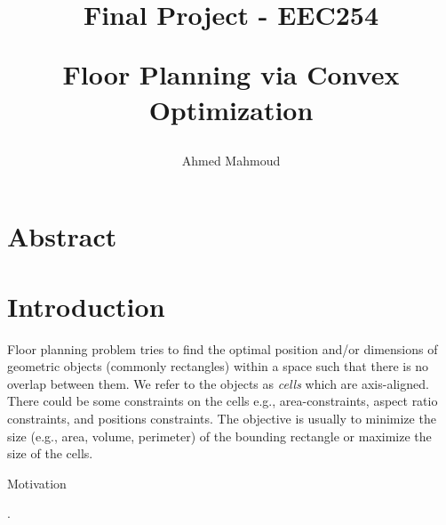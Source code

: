 \documentclass[12pt] {article}
\begin{document}

\title{
Final Project -  EEC254 \\
\begin{large}
Floor Planning via Convex Optimization
\end{large}
}
\author{Ahmed Mahmoud}
\date{}
\maketitle



\section{Abstract}
\section{Introduction}
Floor planning problem tries to find the optimal position and/or dimensions of geometric objects (commonly rectangles) within a space such that there is no overlap between them. We refer to the objects as \emph{cells} which are axis-aligned. There could be some constraints on the cells e.g., area-constraints, aspect ratio constraints, and positions constraints. The objective is usually to minimize the size (e.g., area, volume, perimeter) of the bounding rectangle or maximize the size of the cells. \begin{LARGE}\color{red}Motivation\end{LARGE}.
\end{document}
